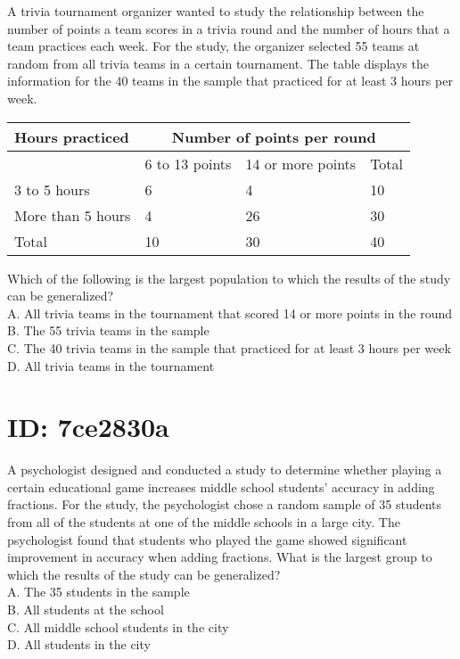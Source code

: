 












A trivia tournament organizer wanted to study the relationship between the number of points a team scores in a trivia round and the number of hours that a team practices each week. For the study, the organizer selected 55 teams at random from all trivia teams in a certain tournament. The table displays the information for the 40 teams in the sample that practiced for at least 3 hours per week.

\begin{center}
\begin{tabular}{|l|l|l|l|}
\hline
\multirow{2}{*}{Hours practiced} & \multicolumn{3}{|c|}{Number of points per round} \\
\hline
 & 6 to 13 points & 14 or more points & Total \\
\hline
3 to 5 hours & 6 & 4 & 10 \\
\hline
More than 5 hours & 4 & 26 & 30 \\
\hline
Total & 10 & 30 & 40 \\
\hline
\end{tabular}
\end{center}

Which of the following is the largest population to which the results of the study can be generalized?\\
A. All trivia teams in the tournament that scored 14 or more points in the round\\
B. The 55 trivia teams in the sample\\
C. The 40 trivia teams in the sample that practiced for at least 3 hours per week\\
D. All trivia teams in the tournament

\section*{ID: 7ce2830a}
A psychologist designed and conducted a study to determine whether playing a certain educational game increases middle school students' accuracy in adding fractions. For the study, the psychologist chose a random sample of 35 students from all of the students at one of the middle schools in a large city. The psychologist found that students who played the game showed significant improvement in accuracy when adding fractions. What is the largest group to which the results of the study can be generalized?\\
A. The 35 students in the sample\\
B. All students at the school\\
C. All middle school students in the city\\
D. All students in the city

